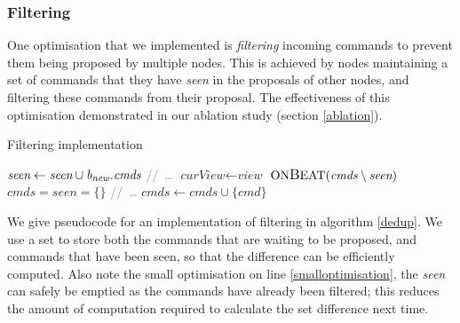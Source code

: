 \subsubsection{Filtering} \label{filtering}
One optimisation that we implemented is \textit{filtering} incoming commands to prevent them being proposed by multiple nodes. This is achieved by nodes maintaining a set of commands that they have \textit{seen} in the proposals of other nodes, and filtering these commands from their proposal. The effectiveness of this optimisation demonstrated in our ablation study (section \ref{ablation}).

\begin{algorithm}[h!]
	\caption{Filtering implementation} \label{dedup}
	\begin{algorithmic}[1]
			\State $ \textit{seen} \gets \textit{seen} \cup \textit{b\textsubscript{new}.cmds}$
			\State \textcolor{gray}{//\ \dots}
		\EndIf
	\EndProcedure
		\State $ \textit{curView} \gets \textit{view}$
		\State $ \text{ON{\large B}EAT}(\textit{cmds} \setminus \textit{seen})$
		\State $ \textit{cmds} = \textit{seen} = \{\}$ \label{smalloptimisation}
		\State \textcolor{gray}{//\ \dots}
	\EndProcedure
		\State $ \textit{cmds} \gets \textit{cmds} \cup \{\textit{cmd}\} $
	\EndProcedure
	\end{algorithmic}
\end{algorithm}

We give pseudocode for an implementation of filtering in algorithm \ref{dedup}. We use a set to store both the commands that are waiting to be proposed, and commands that have been seen, so that the difference can be efficiently computed. Also note the small optimisation on line \ref{smalloptimisation}, the \textit{seen} can safely be emptied as the commands have already been filtered; this reduces the amount of computation required to calculate the set difference next time.


